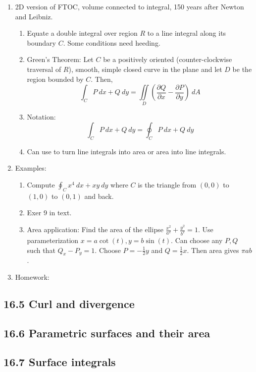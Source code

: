 \documentclass{article}
\newcommand{\ds}{\displaystyle}
\begin{document}
\begin{enumerate}

\item 2D version of FTOC, volume connected to integral, 150 years after Newton and Leibniz.
\begin{enumerate}
\item Equate a double integral over region $R$ to a line integral along its boundary $C$. Some conditions need heeding.
\item Green's Theorem: Let $C$ be a positively oriented (counter-clockwise traversal of $R$), smooth, simple closed curve in the plane and let $D$ be the region bounded by $C$. Then,
\[
\int_C P~dx + Q~dy = \iint\limits_D \left( \frac{\partial Q}{\partial x} - \frac{\partial P}{\partial y} \right) ~dA
\]
\item Notation:
\[
\int_C P~dx + Q~dy = \oint_C P~dx + Q~dy
\]
\item Can use to turn line integrals into area or area into line integrals.
\end{enumerate}

\item Examples:
\begin{enumerate}
\item Compute $\ds \oint_C x^4~dx + xy ~dy$ where $C$ is the triangle from $(0,0)$ to $(1,0)$ to $(0,1)$ and back.
\item Exer 9 in text.
\item Area application: Find the area of the ellipse $\ds \frac{x^2}{a^2} +\frac{y^2}{b^2} = 1$. Use parameterization $x=a\cot(t), y=b\sin(t)$. Can choose any $P, Q$ such that $Q_x-P_y=1$. Choose $P=-\frac{1}{2}y$ and $Q=\frac{1}{2}x$. Then area gives $\pi a b$.
\end{enumerate}

\item Homework:

\end{enumerate}


\subsection{16.5 Curl and divergence}
\subsection{16.6 Parametric surfaces and their area}
\subsection{16.7 Surface integrals}
\end{document}
